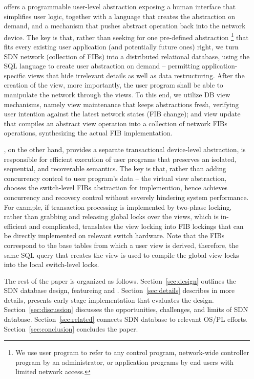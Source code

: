 

\TI offers a programmable user-level abstraction exposing a human
interface that simplifies user logic, together with a language that
creates the abstraction on demand, and a mechanism that pushes
abstract operation back into the network device.  The key is that,
rather than seeking for one pre-defined abstraction \footnote{We use
  user program to refer to any control program, \eg network-wide
  controller program by an administrator, or application programs by
  end users with limited network access.}  that fits every existing
user application (and potentially future ones) right, we turn SDN
network (collection of FIBs) into a distributed relational database,
using the SQL language to create user abstraction on demand --
permitting application-specific views that hide irrelevant details as
well as data restructuring. After the creation of the view, more
importantly, the user program shall be able to manipulate the network
through the views. To this end, we utilize DB view mechanisms, namely
view maintenance that keeps abstractions fresh, verifying user
intention against the latest network states (FIB change); and view
update that compiles an abstract view operation into a collection of
network FIBs operations, synthesizing the actual FIB implementation.

\TR, on the other hand, provides a separate transactional device-level
abstraction, is responsible for efficient execution of user programs
that preserves an isolated, sequential, and recoverable semantics. The
key is that, rather than adding concurrency control to user program's
data -- the virtual view abstraction, \TR chooses the switch-level
FIBs abstraction for implemention, hence achieves concurrency and
recovery control without severely hindering system performance. For
example, if transaction processing is implemented by two-phase
locking, rather than grabbing and releasing global locks over the
views, which is in-efficient and complicated, \TR translates the view
locking into FIB lockings that can be directly implemented on relevant
switch hardware. Note that the FIBs correspond to the base tables from
which a user view is derived, therefore, the same SQL query that
creates the view is used to compile the global view locks into the
local switch-level locks.

The rest of the paper is organized as
follows. Section~\ref{sec:design} outlines the SDN database design,
featureing \TI and \TR.  Section~\ref{sec:details} describes \TI in
more details, presents early stage implementation that evaluates the
\TI design. Section~\ref{sec:discussion} discusses the opportunities,
challenges, and limits of SDN database. Section~\ref{sec:related}
connects SDN database to relevant OS/PL
efforts. Section~\ref{sec:conclusion} concludes the paper.

